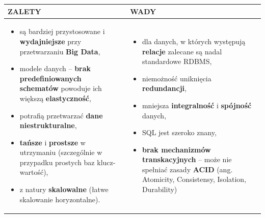 \documentclass[a4paper]{article}
\begin{document}
    \begin{table}[H]
        \begin{center}
            \begin{tabular}{p{8cm} | p{8cm}}
                \textbf{ZALETY} & \textbf{WADY}\\
                \hline
                \begin{itemize}
                    \item są bardziej przystosowane i \textbf{wydajniejsze} przy przetwarzaniu \textbf{Big Data},
                    \item modele danych – \textbf{brak predefiniowanych schematów} powoduje ich większą \textbf{elastyczność},
                    \item potrafią przetwarzać \textbf{dane niestrukturalne},
                    \item \textbf{tańsze} i \textbf{prostsze} w utrzymaniu (szczególnie w przypadku prostych baz klucz-wartość),
                    \item z natury \textbf{skalowalne} (łatwe skalowanie horyzontalne).
                \end{itemize}
                &
                \begin{itemize}
                    \item dla danych, w których występują \textbf{relacje} zalecane są nadal standardowe RDBMS,
                    \item niemożność uniknięcia \textbf{redundancji},
                    \item mniejsza \textbf{integralność} i \textbf{spójność} danych,
                    \item SQL jest szeroko znany,
                    \item \textbf{brak mechanizmów transkacyjnych} – może nie spełniać zasady \textbf{ACID} (ang. Atomicity, Consistensy, Isolation, Durability)
                \end{itemize}\\
            \end{tabular}
        \end{center}
    \end{table}
\end{document}
